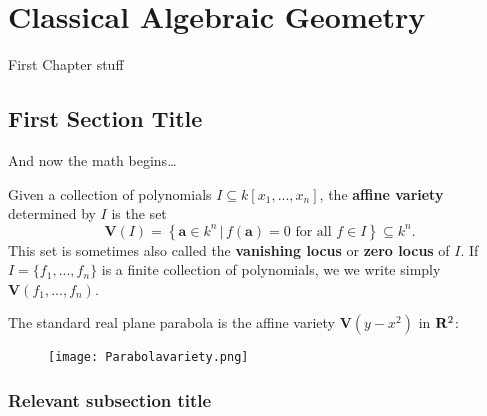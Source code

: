 \chapter{Classical Algebraic Geometry} \label{classical}

First Chapter stuff

\section{First Section Title}

And now the math begins\dots

\begin{definition}
Given a collection of polynomials $I\subseteq k[x_{1},..., x_{n}]$, the \textbf{affine variety} determined by $I$ is the set
\[
\mathbf{V}(I)=\left\{\mathbf{a}\in k^n\,|\,f(\mathbf{a})=0\text{ for all }f\in I\right\}\subseteq k^n.
\]
This set is sometimes also called the {\bfseries vanishing locus} or {\bfseries zero locus} of $I$. If $I=\lbrace f_{1},..., f_{n}\rbrace$ is a finite collection of polynomials, we we write simply $\mathbf{V}(f_{1},..., f_{n})$.
\end{definition}

\begin{example}
The standard real plane parabola is the affine variety $\mathbf{V}(y-x^{2})$ in ${\bf R}^2$:
\begin{figure}[ht]
    \centering
    \texttt{[image: Parabolavariety.png]}
\end{figure}
\end{example}


\subsection{Relevant subsection title}

